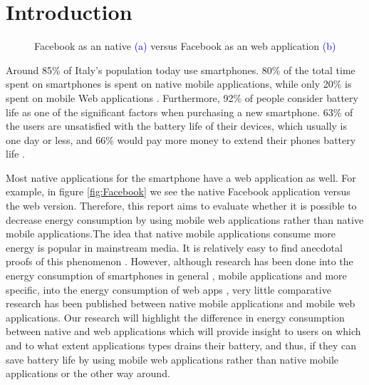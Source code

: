 \section{Introduction}\label{sec:intro}
\begin{figure*}[ht]
  \centering
  \qquad
  \caption[Facebook native vs Facebook web]{Facebook as an native \textcolor{blue}{(a)} versus Facebook as an web application \textcolor{blue}{(b)}}
  \label{fig:Facebook}
\end{figure*}


Around 85\% of Italy's population today use smartphones. 80\% of the total time spent on smartphones is spent on native mobile applications, while only 20\% is spent on mobile Web applications \cite{MobileMark}. Furthermore, 92\% of people consider battery life as one of the significant factors when purchasing a new smartphone. 63\% of the users are unsatisfied with the battery life of their devices, which usually is one day or less, and 66\% would pay more money to extend their phones battery life \cite{BatteryLife_survey}.

Most native applications for the smartphone have a web application as well. For example, in figure \autoref{fig:Facebook} we see the native Facebook application versus the web version. Therefore, this report aims to evaluate whether it is possible to decrease energy consumption by using mobile web applications rather than native mobile applications.The idea that native mobile applications consume more energy is popular in mainstream media. It is relatively easy to find anecdotal proofs of this phenomenon \cite{itworld}. However, although  research has been done into the energy consumption of smartphones in general \cite{pathak2011fine}, mobile applications \cite{balasubramanian2009energy, li2014empirical, couto2014detecting, hao2013estimating} and more specific, into the energy consumption of web apps \cite{thiagarajan2012killed}, very little comparative research has been published between native mobile applications and mobile web applications. Our research will highlight the difference in energy consumption between native and web applications which will provide insight to users on which and to what extent applications types drains their battery, and thus, if they can save battery life by using mobile web applications rather than native mobile applications or the other way around.

